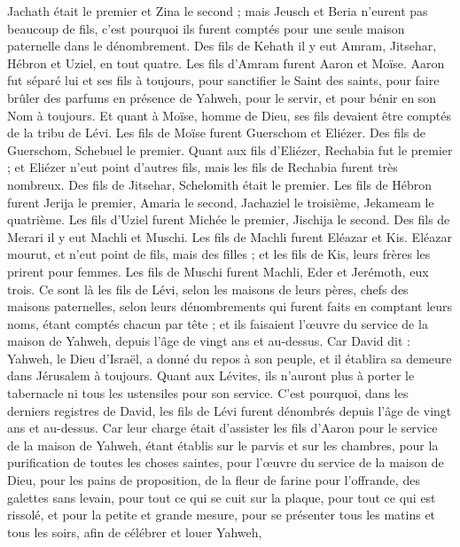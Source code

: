 \begin{multicols}{2}
Jachath était le premier et Zina le second ; mais Jeusch et Beria n'eurent pas beaucoup de fils, c'est pourquoi ils furent comptés pour une seule maison paternelle dans le dénombrement.
Des fils de Kehath il y eut Amram, Jitsehar, Hébron et Uziel, en tout quatre.
Les fils d'Amram furent Aaron et Moïse. Aaron fut séparé lui et ses fils à toujours, pour sanctifier le Saint des saints, pour faire brûler des parfums en présence de Yahweh, pour le servir, et pour bénir en son Nom à toujours.
Et quant à Moïse, homme de Dieu, ses fils devaient être comptés de la tribu de Lévi.
Les fils de Moïse furent Guerschom et Eliézer.
Des fils de Guerschom, Schebuel le premier.
Quant aux fils d'Eliézer, Rechabia fut le premier ; et Eliézer n'eut point d'autres fils, mais les fils de Rechabia furent très nombreux.
Des fils de Jitsehar, Schelomith était le premier.
Les fils de Hébron furent Jerija le premier, Amaria le second, Jachaziel le troisième, Jekameam le quatrième.
Les fils d'Uziel furent Michée le premier, Jischija le second.
Des fils de Merari il y eut Machli et Muschi. Les fils de Machli furent Eléazar et Kis.
Eléazar mourut, et n'eut point de fils, mais des filles ; et les fils de Kis, leurs frères les prirent pour femmes.
Les fils de Muschi furent Machli, Eder et Jerémoth, eux trois.
Ce sont là les fils de Lévi, selon les maisons de leurs pères, chefs des maisons paternelles, selon leurs dénombrements qui furent faits en comptant leurs noms, étant comptés chacun par tête ; et ils faisaient l'œuvre du service de la maison de Yahweh, depuis l'âge de vingt ans et au-dessus.
Car David dit : Yahweh, le Dieu d'Israël, a donné du repos à son peuple, et il établira sa demeure dans Jérusalem à toujours.
Quant aux Lévites, ils n'auront plus à porter le tabernacle ni tous les ustensiles pour son service.
C'est pourquoi, dans les derniers registres de David, les fils de Lévi furent dénombrés depuis l'âge de vingt ans et au-dessus.
Car leur charge était d'assister les fils d'Aaron pour le service de la maison de Yahweh, étant établis sur le parvis et sur les chambres, pour la purification de toutes les choses saintes, pour l'œuvre du service de la maison de Dieu,
pour les pains de proposition, de la fleur de farine pour l'offrande, des galettes sans levain, pour tout ce qui se cuit sur la plaque, pour tout ce qui est rissolé, et pour la petite et grande mesure,
pour se présenter tous les matins et tous les soirs, afin de célébrer et louer Yahweh,

\end{multicols}
